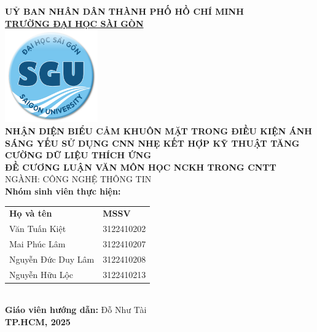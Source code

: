 \begin{titlepage}

    \vspace*{-1cm} 
    \centering

    {\LARGE \textbf{UỶ BAN NHÂN DÂN THÀNH PHỐ HỒ CHÍ MINH}} \\[0.5cm] %
    {\Large \textbf{\underline{TRƯỜNG ĐẠI HỌC SÀI GÒN}}} \\[1cm]

    \includegraphics[width=4cm]{./img/logo.png} \\[1cm]

    {\huge \textbf{NHẬN DIỆN BIỂU CẢM KHUÔN MẶT TRONG ĐIỀU KIỆN ÁNH SÁNG YẾU SỬ DỤNG CNN NHẸ KẾT HỢP KỸ THUẬT TĂNG CƯỜNG DỮ LIỆU THÍCH ỨNG}} \\[1.5cm]

    {\Large \textbf{ĐỀ CƯƠNG LUẬN VĂN MÔN HỌC NCKH TRONG CNTT}} \\[0.5cm]
    {\Large NGÀNH: CÔNG NGHỆ THÔNG TIN} \\[1cm]

    \textbf{Nhóm sinh viên thực hiện:} \\[0.5cm]
    \begin{tabular}{l l}
        \textbf{Họ và tên} & \textbf{MSSV} \\ 
        Văn Tuấn Kiệt & 3122410202 \\ 
        Mai Phúc Lâm & 3122410207 \\ 
        Nguyễn Đức Duy Lâm & 3122410208 \\ 
        Nguyễn Hữu Lộc & 3122410213 \\ 
    \end{tabular}
    \\[1cm]  %
    \textbf{Giáo viên hướng dẫn:} Đỗ Như Tài \\[0.5cm]
    \textbf{TP.HCM, 2025}
\end{titlepage}